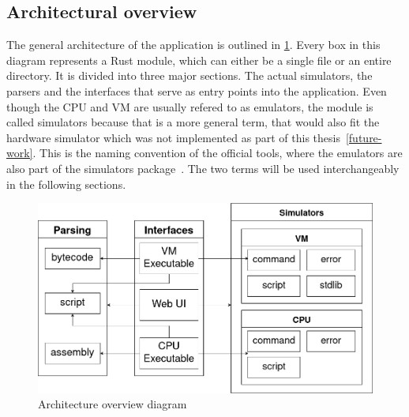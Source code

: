 
\subsection{Architectural overview}
The general architecture of the application is outlined in \cref{fig:arch}. Every box in this diagram represents a Rust module, which can either be a single file or an entire directory.
It is divided into three major sections. The actual simulators, the parsers and the interfaces that serve as entry points into the application. Even though the CPU and VM are usually refered to as emulators, the module is called simulators because that is a more general term, that would also fit the hardware simulator which was not implemented as part of this thesis~\ref{future-work}. This is the naming convention of the official tools, where the emulators are also part of the simulators package~\cite{n2tsimulators}. The two terms will be used interchangeably in the following sections.

\begin{center}
  \begin{figure}[ht]
    \centering
    \includegraphics[width=12cm]{fig/architecture.png}
    \caption{Architecture overview diagram}%
    \label{fig:arch}
  \end{figure}
\end{center}

